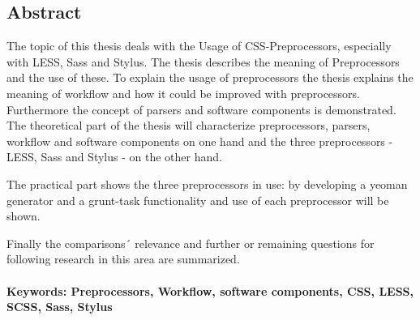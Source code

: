 \subsection*{Abstract}

The topic of this thesis deals with the Usage of CSS-Preprocessors, especially with LESS, Sass and Stylus. The thesis describes the meaning of Preprocessors and the use of these.
To explain the usage of preprocessors the thesis explains the meaning of workflow and how it could be improved with preprocessors. \newline
Furthermore the concept of parsers and software components is demonstrated. \newline
The theoretical part of the thesis will characterize preprocessors, parsers, workflow and software components on one hand and the three preprocessors - \glqq{}LESS\grqq{}, \glqq{}Sass\grqq{} and \glqq{}Stylus\grqq{} - on the other hand.\newline

The practical part shows the three preprocessors in use: by developing a yeoman generator and a grunt-task functionality and use of each preprocessor will be shown.

Finally the comparisons´ relevance and further or remaining questions for following research in this area are summarized.


\paragraph{Keywords: Preprocessors, Workflow, software components, CSS, LESS, SCSS, Sass, Stylus}
\textit{}


